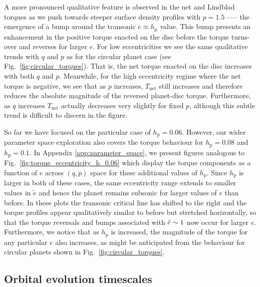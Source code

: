 A more pronounced qualitative feature is observed in the net and Lindblad torques as we push towards steeper surface density profiles with $p=1.5$ ----- the emergence of a bump around the transonic $e\approx h_\mathrm{p}$ value. This bump presents an enhancement in the positive torque enacted on the disc before the torque turns-over and reverses for larger $e$. For low eccentricities we see the same qualitative trends with $q$ and $p$ as for the circular planet case (see Fig.~\ref{fig:circular_torques}). That is, the net torque enacted on the disc increases with both $q$ and $p$. Meanwhile, for the high eccentricity regime where the net torque is negative, we see that as $p$ increases, $T_\mathrm{net}$ still increases and therefore reduces the absolute magnitude of the reversed planet-disc torque. Furthermore, as $q$ increases $T_\textrm{net}$ actually decreases very slightly for fixed $p$, although this subtle trend is difficult to discern in the figure.

So far we have focused on the particular case of $h_\textrm{p} = 0.06$. However, our wider parameter space exploration also covers the torque behaviour for $h_\textrm{p} = 0.08$ and $h_\textrm{p} = 0.1$. In Appendix \ref{app:parameter_space}, we present figures analogous to Fig.~\ref{fig:torque_eccentricity_h_0.06} which display the torque components as a function of $e$ across $(q,p)$ space for these additional values of $h_\textrm{p}$. Since $h_\textrm{p}$ is larger in both of these cases, the same eccentricity range extends to smaller values in $\tilde{e}$ and hence the planet remains subsonic for larger values of $e$ than before. In these plots the transonic critical line has shifted to the right and the torque profiles appear qualitatively similar to before but stretched horizontally, so that the torque reversals and bumps associated with $\Tilde{e}\sim 1$ now occur for larger $e$. Furthermore, we notice that as $h_\textrm{p}$ is increased, the magnitude of the torque for any particular $e$ also increases, as might be anticipated from the behaviour for circular planets shown in Fig.~\ref{fig:circular_torques}.

\subsection{Orbital evolution timescales}
\label{subsection:orbital_evolution}

